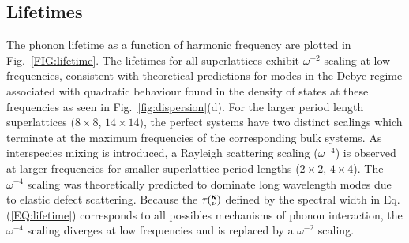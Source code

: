 \documentclass[aps,prb,preprint,preprintnumbers,amsmath,amssymb,floatfix,superscriptaddress]{revtex4}
\newcommand{\kv}{\mspace{-4.0mu}\left(\mspace{-8.0mu}
\begin{smallmatrix}&\pmb{\kappa} \\&\nu\end{smallmatrix}
\mspace{-3.0mu}\right)}
\begin{document}


\subsection{Lifetimes}

The phonon lifetime as a function of harmonic frequency are plotted in Fig.~\ref{FIG:lifetime}. The lifetimes for all superlattices exhibit $\omega^{-2}$ scaling at low frequencies, consistent with theoretical predictions for modes in the Debye regime associated with quadratic behaviour found in the density of states at these frequencies as seen in Fig.~\ref{fig:dispersion}(d).\cite{Klemens_Thermal_1951} For the larger period length superlattices ($8\times8$, $14\times14$), the perfect systems have two distinct scalings which terminate at the maximum frequencies of the corresponding bulk systems. As interspecies mixing is introduced, a Rayleigh scattering scaling ($\omega^{-4}$) is observed at larger frequencies for smaller superlattice period lengths ($2\times2$, $4\times4$). The $\omega^{-4}$ scaling was theoretically predicted to dominate long wavelength modes due to elastic defect scattering.\cite{PhysRev.140.A1812,klemens_scattering_1955-3, klemens_thermal_1957-2} Because the $\tau\kv$ defined by the spectral width in Eq.(\ref{EQ:lifetime}) corresponds to all possibles mechanisms of phonon interaction, the $\omega^{-4}$ scaling diverges at low frequencies and is replaced by a $\omega^{-2}$ scaling. 
\end{document}
